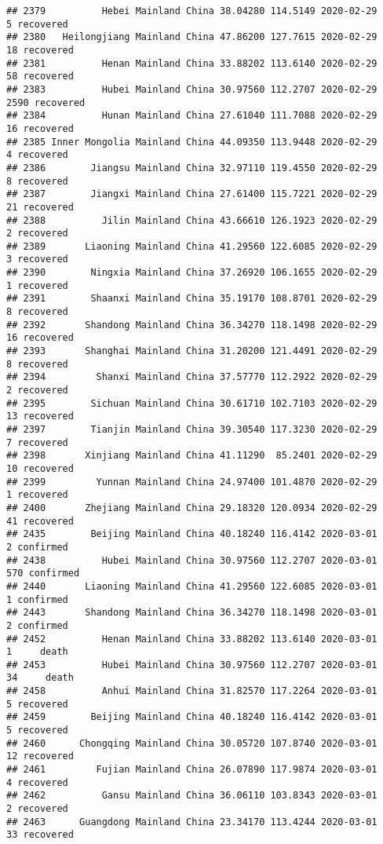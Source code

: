 \documentclass[
]{article}
\begin{document}
\begin{verbatim}
## 2379          Hebei Mainland China 38.04280 114.5149 2020-02-29     5 recovered
## 2380   Heilongjiang Mainland China 47.86200 127.7615 2020-02-29    18 recovered
## 2381          Henan Mainland China 33.88202 113.6140 2020-02-29    58 recovered
## 2383          Hubei Mainland China 30.97560 112.2707 2020-02-29  2590 recovered
## 2384          Hunan Mainland China 27.61040 111.7088 2020-02-29    16 recovered
## 2385 Inner Mongolia Mainland China 44.09350 113.9448 2020-02-29     4 recovered
## 2386        Jiangsu Mainland China 32.97110 119.4550 2020-02-29     8 recovered
## 2387        Jiangxi Mainland China 27.61400 115.7221 2020-02-29    21 recovered
## 2388          Jilin Mainland China 43.66610 126.1923 2020-02-29     2 recovered
## 2389       Liaoning Mainland China 41.29560 122.6085 2020-02-29     3 recovered
## 2390        Ningxia Mainland China 37.26920 106.1655 2020-02-29     1 recovered
## 2391        Shaanxi Mainland China 35.19170 108.8701 2020-02-29     8 recovered
## 2392       Shandong Mainland China 36.34270 118.1498 2020-02-29    16 recovered
## 2393       Shanghai Mainland China 31.20200 121.4491 2020-02-29     8 recovered
## 2394         Shanxi Mainland China 37.57770 112.2922 2020-02-29     2 recovered
## 2395        Sichuan Mainland China 30.61710 102.7103 2020-02-29    13 recovered
## 2397        Tianjin Mainland China 39.30540 117.3230 2020-02-29     7 recovered
## 2398       Xinjiang Mainland China 41.11290  85.2401 2020-02-29    10 recovered
## 2399         Yunnan Mainland China 24.97400 101.4870 2020-02-29     1 recovered
## 2400       Zhejiang Mainland China 29.18320 120.0934 2020-02-29    41 recovered
## 2435        Beijing Mainland China 40.18240 116.4142 2020-03-01     2 confirmed
## 2438          Hubei Mainland China 30.97560 112.2707 2020-03-01   570 confirmed
## 2440       Liaoning Mainland China 41.29560 122.6085 2020-03-01     1 confirmed
## 2443       Shandong Mainland China 36.34270 118.1498 2020-03-01     2 confirmed
## 2452          Henan Mainland China 33.88202 113.6140 2020-03-01     1     death
## 2453          Hubei Mainland China 30.97560 112.2707 2020-03-01    34     death
## 2458          Anhui Mainland China 31.82570 117.2264 2020-03-01     5 recovered
## 2459        Beijing Mainland China 40.18240 116.4142 2020-03-01     5 recovered
## 2460      Chongqing Mainland China 30.05720 107.8740 2020-03-01    12 recovered
## 2461         Fujian Mainland China 26.07890 117.9874 2020-03-01     4 recovered
## 2462          Gansu Mainland China 36.06110 103.8343 2020-03-01     2 recovered
## 2463      Guangdong Mainland China 23.34170 113.4244 2020-03-01    33 recovered

\end{verbatim}
\end{document}
